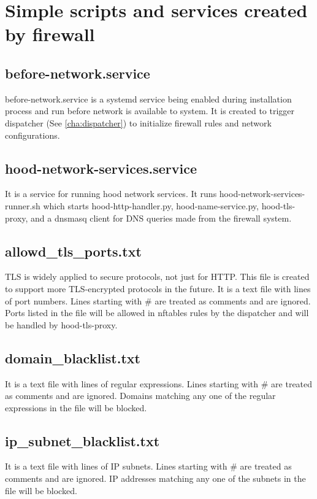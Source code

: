 \documentclass[mscthesis]{usiinfthesis}
\begin{document}
\appendix

\chapter{Simple scripts and services created by firewall}

\section{before-network.service}\label{sec:before-network-service}
before-network.service is a systemd service being enabled during installation process and run before network is available to system. It is created to trigger dispatcher (See \cref{cha:dispatcher}) to initialize firewall rules and network configurations.

\section{hood-network-services.service}\label{sec:hood-network-services.service}
It is a service for running hood network services. It runs hood-network-services-runner.sh which starts hood-http-handler.py, hood-name-service.py, hood-tls-proxy, and a dnsmasq client for DNS queries made from the firewall system.

\section{allowd\_tls\_ports.txt}\label{sec:allowed_tls_ports.txt}
TLS is widely applied to secure protocols, not just for HTTP. This file is created to support more TLS-encrypted protocols in the future. It is a text file with lines of port numbers. Lines starting with \# are treated as comments and are ignored. Ports listed in the file will be allowed in nftables rules by the dispatcher and will be handled by hood-tls-proxy.

\section{domain\_blacklist.txt}\label{sec:domain_blacklist.txt}
It is a text file with lines of regular expressions. Lines starting with \# are treated as comments and are ignored. Domains matching any one of the regular expressions in the file will be blocked.

\section{ip\_subnet\_blacklist.txt}\label{sec:ip_subnet_blacklist.txt}
It is a text file with lines of IP subnets. Lines starting with \# are treated as comments and are ignored. IP addresses matching any one of the subnets in the file will be blocked.
\end{document}
